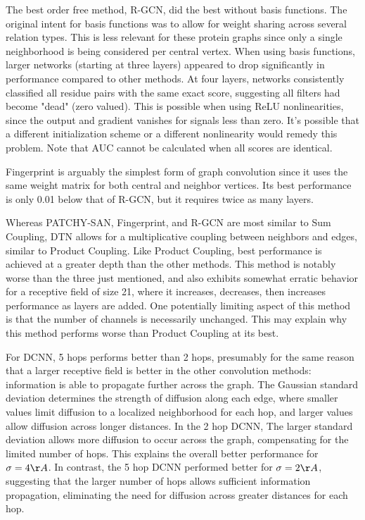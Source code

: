 The best order free method, R-GCN, did the best without basis functions.
The original intent for basis functions was to allow for weight sharing across several relation types.
This is less relevant for these protein graphs since only a single neighborhood is being considered per central vertex. 
When using basis functions, larger networks (starting at three layers) appeared to drop significantly in performance compared to other methods.
At four layers, networks consistently classified all residue pairs with the same exact score, suggesting all filters had become "dead" (zero valued).
This is possible when using ReLU nonlinearities, since the output and gradient vanishes for signals less than zero.
It's possible that a different initialization scheme or a different nonlinearity would remedy this problem.
Note that AUC cannot be calculated when all scores are identical.

Fingerprint is arguably the simplest form of graph convolution since it uses the same weight matrix for both central and neighbor vertices.
Its best performance is only 0.01 below that of R-GCN, but it requires twice as many layers.

Whereas PATCHY-SAN, Fingerprint, and R-GCN are most similar to Sum Coupling, DTN allows for a multiplicative coupling between neighbors and edges, similar to Product Coupling.
Like Product Coupling, best performance is achieved at a greater depth than the other methods.
This method is notably worse than the three just mentioned, and also exhibits somewhat erratic behavior for a receptive field of size 21, where it increases, decreases, then increases performance as layers are added. 
One potentially limiting aspect of this method is that the number of channels is necessarily unchanged.
This may explain why this method performs worse than Product Coupling at its best.


For DCNN, 5 hops performs better than 2 hops, presumably for the same reason that a larger receptive field is better in the other convolution methods: information is able to propagate further across the graph.
The Gaussian standard deviation determines the strength of diffusion along each edge, where smaller values limit diffusion to a localized neighborhood for each hop, and larger values allow diffusion across longer distances.
In the 2 hop DCNN, The larger standard deviation allows more diffusion to occur across the graph, compensating for the limited number of hops.
This explains the overall better performance for $\sigma=4\AA{}$.
In contrast, the 5 hop DCNN performed better for $\sigma=2\AA{}$, suggesting that the larger number of hops allows sufficient information propagation, eliminating the need for diffusion across greater distances for each hop.


